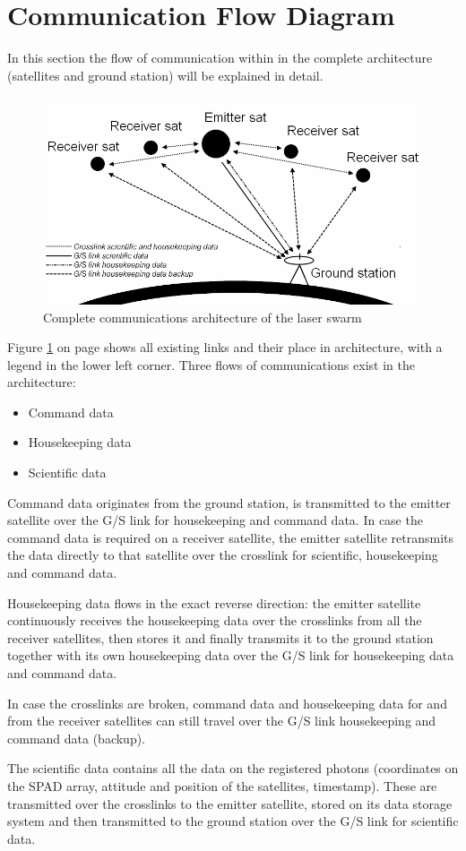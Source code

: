 \section{Communication Flow Diagram}
\label{CFD}

In this section the flow of communication within in the complete architecture (satellites and ground station) will be explained in detail.
\begin{figure}[ht]
\centering
\includegraphics[width=1.0\textwidth, angle=0]{chapters/img/allesZW.png}
\caption{Complete communications architecture of the laser swarm}
\label{fig:allesZWW}
\end{figure}

Figure \ref{fig:allesZWW} on page \pageref{fig:allesZWW} shows all existing links and their place in architecture, with a legend in the lower left corner.
Three flows of communications exist in the architecture:
\begin{itemize}
\item Command data
\item Housekeeping data
\item Scientific data
\end{itemize}

Command data originates from the ground station, is transmitted to the emitter satellite over the G/S link for housekeeping and command data. In case the command data is required on a receiver satellite, the emitter satellite retransmits the data directly to that satellite over the crosslink for scientific, housekeeping and command data.

Housekeeping data flows in the exact reverse direction: the emitter satellite continuously receives the housekeeping data over the crosslinks from all the receiver satellites, then stores it and finally transmits it to the ground station together with its own housekeeping data over the G/S link for housekeeping data and command data.

In case the crosslinks are broken, command data and housekeeping data for and from the receiver satellites can still travel over the G/S link housekeeping and command data (backup).

The scientific data contains all the data on the registered photons (coordinates on the SPAD array, attitude and position of the satellites, timestamp). These are transmitted over the crosslinks to the emitter satellite, stored on its data storage system and then transmitted to the ground station over the G/S link for scientific data.
